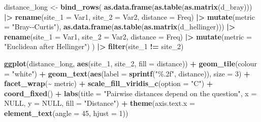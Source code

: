 \documentclass[
  english,
]{article}
\newenvironment{Shaded}{\begin{snugshade}}{\end{snugshade}}
\newcommand{\AttributeTok}[1]{\textcolor[rgb]{0.13,0.29,0.53}{#1}}
\newcommand{\ConstantTok}[1]{\textcolor[rgb]{0.56,0.35,0.01}{#1}}
\newcommand{\DecValTok}[1]{\textcolor[rgb]{0.00,0.00,0.81}{#1}}
\newcommand{\FunctionTok}[1]{\textcolor[rgb]{0.13,0.29,0.53}{\textbf{#1}}}
\newcommand{\NormalTok}[1]{#1}
\newcommand{\OtherTok}[1]{\textcolor[rgb]{0.56,0.35,0.01}{#1}}
\newcommand{\SpecialCharTok}[1]{\textcolor[rgb]{0.81,0.36,0.00}{\textbf{#1}}}
\newcommand{\StringTok}[1]{\textcolor[rgb]{0.31,0.60,0.02}{#1}}
\begin{document}
\begin{Shaded}
\begin{Highlighting}[]
\NormalTok{distance\_long }\OtherTok{\textless{}{-}} \FunctionTok{bind\_rows}\NormalTok{(}
  \FunctionTok{as.data.frame}\NormalTok{(}\FunctionTok{as.table}\NormalTok{(}\FunctionTok{as.matrix}\NormalTok{(d\_bray))) }\SpecialCharTok{|\textgreater{}} \FunctionTok{rename}\NormalTok{(}\AttributeTok{site\_1 =}\NormalTok{ Var1, }\AttributeTok{site\_2 =}\NormalTok{ Var2, }\AttributeTok{distance =}\NormalTok{ Freq) }\SpecialCharTok{|\textgreater{}} \FunctionTok{mutate}\NormalTok{(}\AttributeTok{metric =} \StringTok{"Bray{-}{-}Curtis"}\NormalTok{),}
  \FunctionTok{as.data.frame}\NormalTok{(}\FunctionTok{as.table}\NormalTok{(}\FunctionTok{as.matrix}\NormalTok{(d\_hellinger))) }\SpecialCharTok{|\textgreater{}} \FunctionTok{rename}\NormalTok{(}\AttributeTok{site\_1 =}\NormalTok{ Var1, }\AttributeTok{site\_2 =}\NormalTok{ Var2, }\AttributeTok{distance =}\NormalTok{ Freq) }\SpecialCharTok{|\textgreater{}} \FunctionTok{mutate}\NormalTok{(}\AttributeTok{metric =} \StringTok{"Euclidean after Hellinger"}\NormalTok{)}
\NormalTok{) }\SpecialCharTok{|\textgreater{}} \FunctionTok{filter}\NormalTok{(site\_1 }\SpecialCharTok{!=}\NormalTok{ site\_2)}

\FunctionTok{ggplot}\NormalTok{(distance\_long, }\FunctionTok{aes}\NormalTok{(site\_1, site\_2, }\AttributeTok{fill =}\NormalTok{ distance)) }\SpecialCharTok{+}
  \FunctionTok{geom\_tile}\NormalTok{(}\AttributeTok{colour =} \StringTok{"white"}\NormalTok{) }\SpecialCharTok{+}
  \FunctionTok{geom\_text}\NormalTok{(}\FunctionTok{aes}\NormalTok{(}\AttributeTok{label =} \FunctionTok{sprintf}\NormalTok{(}\StringTok{"\%.2f"}\NormalTok{, distance)), }\AttributeTok{size =} \DecValTok{3}\NormalTok{) }\SpecialCharTok{+}
  \FunctionTok{facet\_wrap}\NormalTok{(}\SpecialCharTok{\textasciitilde{}}\NormalTok{ metric) }\SpecialCharTok{+}
  \FunctionTok{scale\_fill\_viridis\_c}\NormalTok{(}\AttributeTok{option =} \StringTok{"C"}\NormalTok{) }\SpecialCharTok{+}
  \FunctionTok{coord\_fixed}\NormalTok{() }\SpecialCharTok{+}
  \FunctionTok{labs}\NormalTok{(}\AttributeTok{title =} \StringTok{"Pairwise distances depend on the question"}\NormalTok{, }\AttributeTok{x =} \ConstantTok{NULL}\NormalTok{, }\AttributeTok{y =} \ConstantTok{NULL}\NormalTok{, }\AttributeTok{fill =} \StringTok{"Distance"}\NormalTok{) }\SpecialCharTok{+}
  \FunctionTok{theme}\NormalTok{(}\AttributeTok{axis.text.x =} \FunctionTok{element\_text}\NormalTok{(}\AttributeTok{angle =} \DecValTok{45}\NormalTok{, }\AttributeTok{hjust =} \DecValTok{1}\NormalTok{))}
\end{Highlighting}
\end{Shaded}
\end{document}

